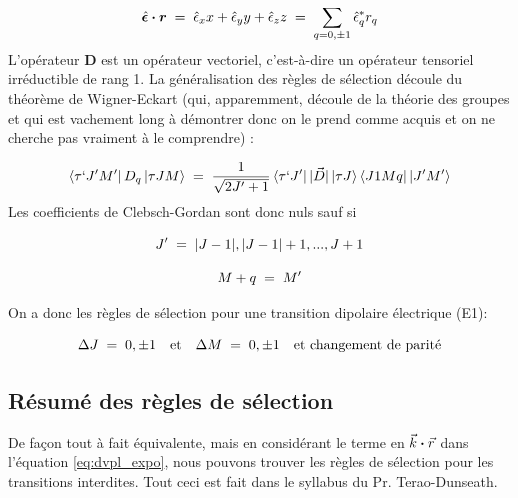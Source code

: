 \begin{equation}
    \hat{\bm{\epsilon}}\boldsymbol{\cdot} \bm{r} \; = \; \hat{\epsilon}_xx + \hat{\epsilon}_yy + \hat{\epsilon}_zz \; = \; \sum_{q=0,\pm 1}  \hat{\epsilon}_q^* r_q
\end{equation}
L'opérateur $\bm{D}$ est un opérateur vectoriel, c'est-à-dire un opérateur tensoriel irréductible de rang 1. La généralisation des règles de sélection découle du théorème de Wigner-Eckart (qui, apparemment, découle de la théorie des groupes et qui est vachement long à démontrer donc on le prend comme acquis et on ne cherche pas vraiment à le comprendre) :

\begin{equation}
    \bra{\tau ` J'M'}D_q\ket{\tau JM}\; = \; \dfrac{1}{\sqrt{2J'+1}}\bra{\tau `J'}|\vec{D}|\ket{\tau J}\bra{J1Mq}\ket{J'M'}
\end{equation}
Les coefficients de Clebsch-Gordan sont donc nuls sauf si

\[
    J'\; = \; |J-1|, |J-1|+1, ..., J+1
\]

\[
    M+q\; = \; M'
\]

On a donc les règles de sélection pour une transition dipolaire électrique (E1):

\begin{equation}
    \Delta J\; = \; 0, \pm1 \quad \text{et} \quad \Delta M\; = \; 0, \pm 1 \quad \text{et        changement de parité}
\end{equation}


\newpage %
\subsection{Résumé des règles de sélection}

De façon tout à fait équivalente, mais en considérant le terme en $\vec{k}\boldsymbol{\cdot}\vec{r}$ dans l'équation \eqref{eq:dvpl_expo}, nous pouvons trouver les règles de sélection pour les transitions interdites. Tout ceci est fait dans le syllabus du Pr. Terao-Dunseath.



